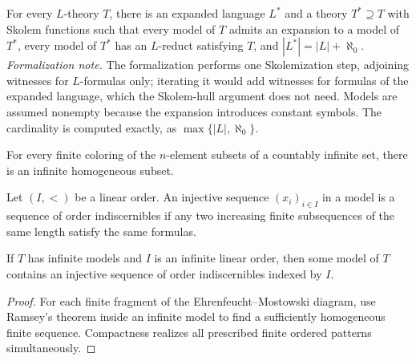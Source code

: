 \begin{theorem}
\label{thm:skolem-expansion}
\leanok
For every \(L\)-theory \(T\), there is an expanded language \(L^*\) and
a theory \(T^*\supseteq T\) with Skolem functions such that every model
of \(T\) admits an expansion to a model of \(T^*\), every model of
\(T^*\) has an \(L\)-reduct satisfying \(T\), and
\(|L^*|=|L|+\aleph_0\).
\emph{Formalization note.}  The formalization performs one Skolemization
step, adjoining witnesses for \(L\)-formulas only; iterating it would add
witnesses for formulas of the expanded language, which the Skolem-hull
argument does not need.  Models are assumed nonempty because the
expansion introduces constant symbols.  The cardinality is computed
exactly, as \(\max\{|L|,\aleph_0\}\).
\end{theorem}

\begin{theorem}
\label{thm:infinite-ramsey}
For every finite coloring of the \(n\)-element subsets of a countably
infinite set, there is an infinite homogeneous subset.
\end{theorem}

\begin{definition}
\label{def:order-indiscernibles}
Let \((I,<)\) be a linear order.  An injective sequence
\((x_i)_{i\in I}\) in a model is a sequence of order indiscernibles if
any two increasing finite subsequences of the same length satisfy the
same formulas.
\end{definition}

\begin{theorem}
\label{thm:existence-of-order-indiscernibles}
If \(T\) has infinite models and \(I\) is an infinite linear order, then
some model of \(T\) contains an injective sequence of order
indiscernibles indexed by \(I\).
\end{theorem}

\begin{proof}
For each finite fragment of the Ehrenfeucht--Mostowski diagram, use
Ramsey's theorem inside an infinite model to find a sufficiently
homogeneous finite sequence.  Compactness realizes all prescribed
finite ordered patterns simultaneously.
\end{proof}


